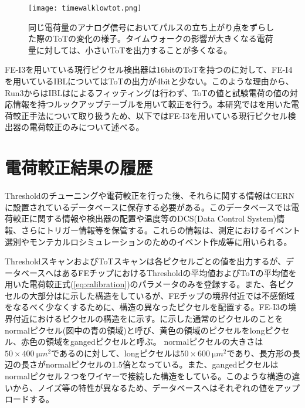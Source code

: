 \begin{figure}[tbp]
  \centering
  \texttt{[image: timewalklowtot.png]}
  \caption[同じ電荷量のアナログ信号においてパルスの立ち上がり点をずらした際のToTの変化]{同じ電荷量のアナログ信号においてパルスの立ち上がり点をずらした際のToTの変化の様子。タイムウォークの影響が大きくなる電荷量に対しては、小さいToTを出力することが多くなる。}
  \label{fig:calibnijikouka}
\end{figure}

FE-I3を用いている現行ピクセル検出器は16bitのToTを持つのに対して、FE-I4を用いているIBLについてはToTの出力が4bitと少ない。このような理由から、Run3からはIBLはによるフィッティングは行わず、ToTの値と試験電荷の値の対応情報を持つルックアップテーブルを用いて較正を行う。本研究ではを用いた電荷較正手法について取り扱うため、以下ではFE-I3を用いている現行ピクセル検出器の電荷較正のみについて述べる。

\section{電荷較正結果の履歴}
\label{sec:probrem}
Thresholdのチューニングや電荷較正を行った後、それらに関する情報はCERNに設置されているデータベース\cite{pixeldb}に保存する必要がある。このデータベースでは電荷較正に関する情報や検出器の配置や温度等のDCS(Data Control System)情報、さらにトリガー情報等を保管する。これらの情報は、測定におけるイベント選別やモンテカルロシミュレーションのためのイベント作成等に用いられる。

ThresholdスキャンおよびToTスキャンは各ピクセルごとの値を出力するが、データベースへはあるFEチップにおけるThresholdの平均値およびToTの平均値を用いた電荷較正式(\ref{eq:calibration})のパラメータのみを登録する。また、各ピクセルの大部分はに示した構造をしているが、FEチップの境界付近では不感領域をなるべく少なくするために、構造の異なったピクセルを配置する。FE-I3の境界付近におけるピクセルの構造をに示す。に示した通常のピクセルのことをnormalピクセル(図中の青の領域)と呼び、黄色の領域のピクセルをlongピクセル、赤色の領域をgangedピクセルと呼ぶ。
normalピクセルの大きさは$50\times 400\ \si{\micro m^2}$であるのに対して、longピクセルは$50\times 600\ \si{\micro m^2}$であり、長方形の長辺の長さがnormalピクセルの1.5倍となっている。また、gangedピクセルはnormalピクセル２つをワイヤーで接続した構造をしている。このような構造の違いから、ノイズ等の特性が異なるため、データベースへはそれぞれの値をアップロードする。

